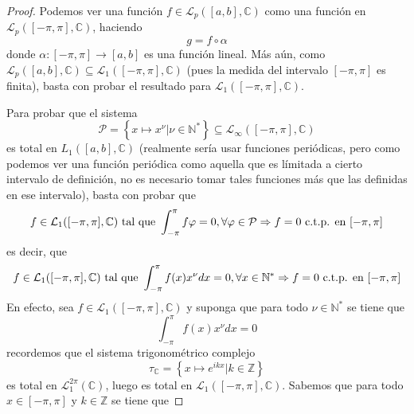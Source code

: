 \documentclass[12pt]{report}
\theoremstyle{largebreak}
\newcommand\cf[3]{\ensuremath{#1:#2\rightarrow#3}}
\begin{document}
    \begin{proof}
        Podemos ver una función $f\in\mathcal{L}_p([a,b],\mathbb{C})$ como una función en $\mathcal{L}_p([-\pi,\pi],\mathbb{C})$, haciendo
        \begin{equation*}
            g=f\circ \alpha
        \end{equation*}
        donde $\cf{\alpha}{[-\pi,\pi]}{[a,b]}$ es una función lineal. Más aún, como $\mathcal{L}_p([a,b],\mathbb{C})\subseteq\mathcal{L}_1([-\pi,\pi],\mathbb{C})$ (pues la medida del intervalo $[-\pi,\pi]$ es finita), basta con probar el resultado para $\mathcal{L}_1([-\pi,\pi],\mathbb{C})$.

        Para probar que el sistema
        \begin{equation*}
            \mathcal{P}=\left\{x\mapsto x^\nu\Big|\nu\in\mathbb{N}^* \right\}\subseteq \mathcal{L}_{ \infty}([-\pi,\pi],\mathbb{C})
        \end{equation*}
        es total en $L_1([a,b],\mathbb{C})$ (realmente sería usar funciones periódicas, pero como podemos ver una función periódica como aquella que es límitada a cierto intervalo de definición, no es necesario tomar tales funciones más que las definidas en ese intervalo), basta con probar que
        \begin{equation*}
            f\in\mathcal{L}_1([-\pi,\pi],\mathbb{C})\textup{ tal que }\int_{ -\pi}^\pi f\varphi=0,\forall \varphi\in\mathcal{P}\Rightarrow f=0\textup{ c.t.p. en }[-\pi,\pi]
        \end{equation*}
        es decir, que
        \begin{equation*}
            f\in\mathcal{L}_1([-\pi,\pi],\mathbb{C})\textup{ tal que }\int_{ -\pi}^\pi f(x)x^\nu dx=0,\forall x\in\mathbb{N}^* \Rightarrow f=0\textup{ c.t.p. en }[-\pi,\pi]
        \end{equation*}
        En efecto, sea $f\in\mathcal{L}_1([-\pi,\pi],\mathbb{C})$ y suponga que para todo $\nu\in\mathbb{N}^*$ se tiene que
        \begin{equation*}
            \int_{ -\pi}^\pi f(x)x^\nu dx=0
        \end{equation*}
        recordemos que el sistema trigonométrico complejo
        \begin{equation*}
            \tau_{\mathbb{C}}=\left\{x\mapsto e^{ ikx}\Big|k\in\mathbb{Z} \right\}
        \end{equation*}
        es total en $\mathcal{L}_1^{2\pi}(\mathbb{C})$, luego es total en $\mathcal{L}_1([-\pi,\pi],\mathbb{C})$. Sabemos que para todo $x\in[-\pi,\pi]$ y $k\in\mathbb{Z}$ se tiene que

\end{proof}
\end{document}
